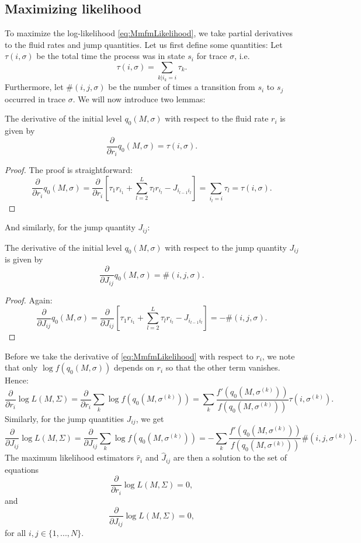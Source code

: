 \subsection{Maximizing likelihood}
To maximize the log-likelihood \eqref{eq:MmfmLikelihood}, we take partial derivatives to the fluid rates and jump quantities.
Let us first define some quantities:
Let $\tau(i,\sigma)$ be the total time the process was in state $s_i$ for trace $\sigma$, i.e.
$$
\tau(i,\sigma)=\sum\limits_{k|i_k=i}\tau_k.
$$
Furthermore, let $\#(i,j,\sigma)$ be the number of times a transition from $s_i$ to $s_j$ occurred in trace $\sigma$.
We will now introduce two lemmas:
\begin{lemma}
	The derivative of the initial level $q_0(M,\sigma)$ with respect to the fluid rate $r_i$ is given by
	\[
	\frac{\partial}{\partial r_i}q_0(M,\sigma)=\tau(i,\sigma).
	\]
	\begin{proof}
		The proof is straightforward:
		\[
		\frac{\partial}{\partial r_i}q_0(M,\sigma)=\frac{\partial}{\partial r_i}\left[\tau_1r_{i_1}+\sum\limits_{l=2}^{L}\tau_lr_{i_l}-J_{i_{l-1}i_l}\right]=\sum\limits_{i_l=i}\tau_l=\tau(i,\sigma).
		\]
	\end{proof}
\end{lemma}
And similarly, for the jump quantity $J_{ij}$:
\begin{lemma}
	The derivative of the initial level  $q_0(M,\sigma)$ with respect to the jump quantity $J_{ij}$ is given by
	\[
	\frac{\partial}{\partial J_{ij}}q_0(M,\sigma)=\#(i,j,\sigma).
	\]
	\begin{proof}
		Again:
		\[
		\frac{\partial}{\partial J_{ij}}q_0(M,\sigma)=\frac{\partial}{\partial J_{ij}}\left[\tau_1r_{i_1}+\sum\limits_{l=2}^{L}\tau_lr_{i_l}-J_{i_{l-1}i_l}\right]=-\#(i,j,\sigma).
		\]
	\end{proof}
\end{lemma}

Before we take the derivative of \eqref{eq:MmfmLikelihood} with respect to $r_i$, we note that only $\log f(q_0(M,\sigma))$ depends on $r_i$ so that the other term vanishes.
Hence:
\[
\frac{\partial}{\partial r_i}\log L(M,\Sigma)
=\frac{\partial }{\partial r_i}\sum_k\log f(q_0(M,\sigma^{(k)}))=\sum_k\frac{f'(q_0(M,\sigma^{(k)}))}{f(q_0(M,\sigma^{(k)}))}\tau(i,\sigma^{(k)}).
\]
Similarly, for the jump quantities $J_{ij}$, we get
$$
\frac{\partial}{\partial J_{ij}}\log L(M,\Sigma)=\frac{\partial}{\partial J_{ij}}\sum_k\log f(q_0(M,\sigma^{(k)}))=-\sum_k\frac{f'(q_0(M,\sigma^{(k)}))}{f(q_0(M,\sigma^{(k)}))}\#(i,j,\sigma^{(k)}).
$$
The maximum likelihood estimators $\hat r_i$ and $\hat J_{ij}$ are then a solution to the set of equations 
\[
\frac{\partial}{\partial r_i}\log L(M,\Sigma)=0,
\]
and
\[
\frac{\partial}{\partial J_{ij}}\log L(M,\Sigma)=0,
\]
for all $i,j\in\{1,...,N\}$.


